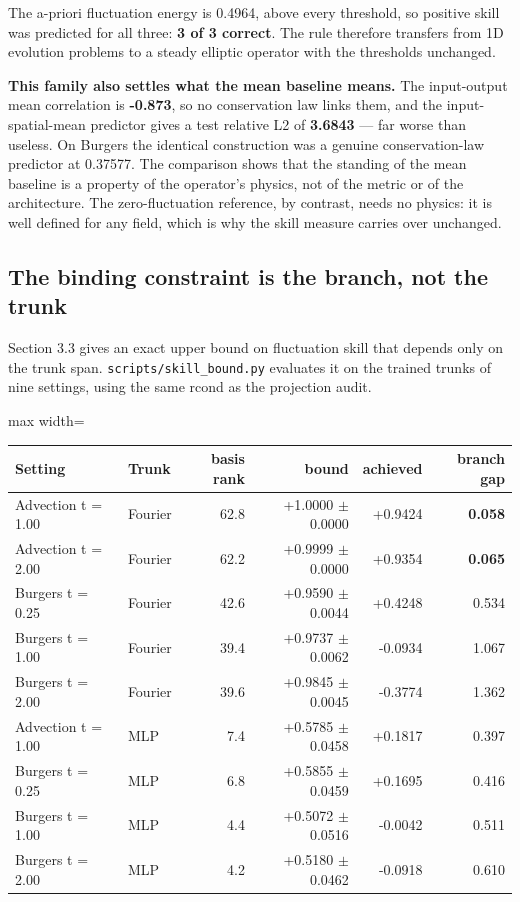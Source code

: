 \documentclass[preprint,12pt]{elsarticle}
\begin{document}
The a-priori fluctuation energy is 0.4964, above every threshold, so positive skill was predicted for all three: \textbf{3 of 3 correct}. The rule therefore transfers from 1D evolution problems to a steady elliptic operator with the thresholds unchanged.

\textbf{This family also settles what the mean baseline means.} The input-output mean correlation is \textbf{-0.873}, so no conservation law links them, and the input-spatial-mean predictor gives a test relative L2 of \textbf{3.6843} --- far worse than useless. On Burgers the identical construction was a genuine conservation-law predictor at 0.37577. The comparison shows that the standing of the mean baseline is a property of the operator's physics, not of the metric or of the architecture. The zero-fluctuation reference, by contrast, needs no physics: it is well defined for any field, which is why the skill measure carries over unchanged.

\subsection{The binding constraint is the branch, not the trunk}

Section 3.3 gives an exact upper bound on fluctuation skill that depends only on the trunk span. \texttt{scripts/skill\_bound.py} evaluates it on the trained trunks of nine settings, using the same rcond as the projection audit.

\begin{center}
\begin{adjustbox}{max width=\linewidth}
\small
\begin{tabular}{llrrrr}
\toprule
Setting & Trunk & basis rank & \textbf{bound} & achieved & \textbf{branch gap} \\
\midrule
Advection t = 1.00 & Fourier & 62.8 & +1.0000 $\pm$ 0.0000 & +0.9424 & \textbf{0.058} \\
Advection t = 2.00 & Fourier & 62.2 & +0.9999 $\pm$ 0.0000 & +0.9354 & \textbf{0.065} \\
Burgers t = 0.25 & Fourier & 42.6 & +0.9590 $\pm$ 0.0044 & +0.4248 & 0.534 \\
Burgers t = 1.00 & Fourier & 39.4 & +0.9737 $\pm$ 0.0062 & -0.0934 & 1.067 \\
Burgers t = 2.00 & Fourier & 39.6 & +0.9845 $\pm$ 0.0045 & -0.3774 & 1.362 \\
Advection t = 1.00 & MLP & 7.4 & +0.5785 $\pm$ 0.0458 & +0.1817 & 0.397 \\
Burgers t = 0.25 & MLP & 6.8 & +0.5855 $\pm$ 0.0459 & +0.1695 & 0.416 \\
Burgers t = 1.00 & MLP & 4.4 & +0.5072 $\pm$ 0.0516 & -0.0042 & 0.511 \\
Burgers t = 2.00 & MLP & 4.2 & +0.5180 $\pm$ 0.0462 & -0.0918 & 0.610 \\
\bottomrule
\end{tabular}
\end{adjustbox}
\end{center}
\end{document}
